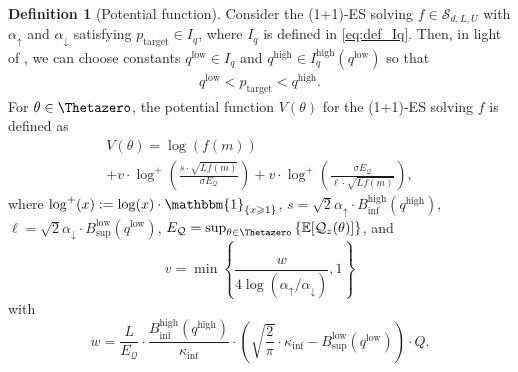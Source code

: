 \documentclass[journal]{IEEEtran}
\providecommand{\E}{\mathbb{E}} %
\providecommand{\ind}[1]{\ensuremath{\mathbbm{1}_{\left\{#1\right\}}}} %
\renewcommand{\geq}{\geqslant} %
\theoremstyle{definition}
\newtheorem{definition}[]{Definition}
\newcommand{\aup}{\alpha_{\uparrow}}
\newcommand{\adown}{\alpha_{\downarrow}}
\begin{document}
\begin{definition}[Potential function]\label{def:potential}
Consider the (1+1)-ES solving $f \in \mathcal{S}_{d,L,U}$ with $\aup$ and $\adown$ satisfying $p_\mathrm{target} \in I_q$, where $I_q$ is defined in \eqref{eq:def_Iq}.
Then, in light of , we can choose 
constants $q^\mathrm{low}\in I_q$ and $q^\mathrm{high}\in I_q^\mathrm{high}(q^\mathrm{low})$
so that  
\begin{align}
 q^\mathrm{low}<p_\mathrm{target}<q^\mathrm{high} .
 \label{eq:ptarget_condition}
\end{align}
For $\theta\in\Thetazero$, the potential function $V(\theta)$ for the (1+1)-ES solving $f$ is defined as
\begin{multline}
V(\theta)
= \log\left(f(m)\right) \\
+ v \cdot \log^+ \left(\frac{s\cdot\sqrt{Lf(m)}}{\sigma E_\mathcal{Q} }\right) 
+  v \cdot \log^+ \left(\frac{\sigma E_\mathcal{Q}}{\ell\cdot\sqrt{Lf(m)}}\right) ,
\label{eq:potential}
\end{multline}
where 
$\log^+(x) := \log(x) \cdot \ind{x\geq 1}$, 
$s = \sqrt{ 2 } \aup\cdot B_{\inf}^\mathrm{high}(q^\mathrm{high})$,
$\ell = \sqrt{2} \adown\cdot 
B_{\sup}^\mathrm{low}(q^\mathrm{low})$,
$E_\mathcal{Q} =
\sup_{\theta\in\Thetazero} \left\{\E[\mathcal{Q}_z(\theta)]\right\}$,
and
\begin{equation}
v = \min\left\{ \frac{w}{4 \log(\aup / \adown)} , 1 \right\}
\label{eq:v}
\end{equation}
with
\begin{equation}
w = 
\frac{L}{E_\mathcal{Q}}
\cdot
\frac{
B_{\inf}^\mathrm{high}(q^\mathrm{high})
}{\kappa_{\inf}}
\cdot
\left(
\sqrt{\frac{2}{\pi}}\cdot\kappa_{\inf}
-
B_{\sup}^\mathrm{low}(q^\mathrm{low})
\right)
\cdot Q .
\label{eq:w}
\end{equation}

\end{definition}
\end{document}
